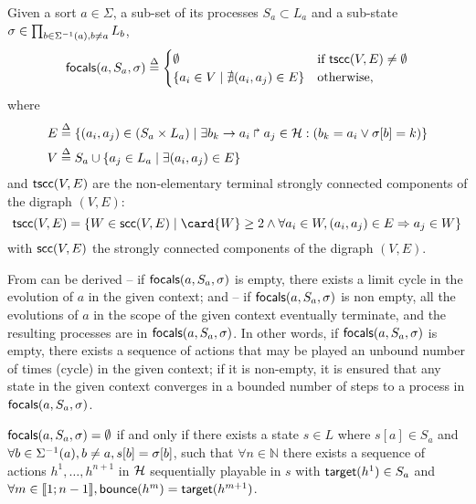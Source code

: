 \begin{definition}\label{def:focals}
Given a sort $a\in\Sigma$, a sub-set of its processes $S_a\subset L_a$ 
and a sub-state
$\sigma \in {\prod_{b\in\Sigma^{-1}(a), b\neq a} L_{b}}$,
\[
\mathsf{focals}(a,S_a,\sigma) \stackrel{\Delta}=
\begin{cases}
\emptyset & \text{if }\mathsf{tscc}(V,E)\neq\emptyset\\
\{ a_i \in V \mid \nexists (a_i,a_j)\in E\} & \text{otherwise,}
\end{cases}
\]
where
\begin{align}
E  & \stackrel{\Delta}= \{(a_i,a_j)\in (S_a \times L_a) \mid 
			\exists b_k\rightarrow a_i\Rsh a_j\in \mathcal{H}:
				(b_k = a_i \vee \sigma[b]=k) \}
\\
V & \stackrel{\Delta}= S_a \cup \{ a_j\in L_a\mid \exists (a_i,a_j)\in E\}
\end{align}
and $\mathsf{tscc}(V,E)$ are the non-elementary terminal strongly connected components of the digraph
$(V,E)$:
\[
\f{tscc}(V,E) = \{
W\in\f{scc}(V,E) \mid \card{W}\geq 2\wedge \forall a_i\in W, (a_i,a_j)\in E\Rightarrow a_j\in W\}
\]
with $\mathsf{scc}(V,E)$ the strongly connected components of the digraph $(V,E)$.
\end{definition}

From  can be derived 
 -- if $\mathsf{focals}(a,S_a,\sigma)$ is empty, there exists a limit cycle in the evolution of
$a$ in the given context;
and  -- if $\mathsf{focals}(a,S_a,\sigma)$ is non empty, all the evolutions of $a$ in the scope
of the given context eventually terminate, and the resulting processes are in $\mathsf{focals}(a,S_a,\sigma)$.
In other words, if $\mathsf{focals}(a,S_a,\sigma)$ is empty, there exists a
sequence of actions that may be played an unbound number of times (cycle) in the given context;
if it is non-empty, it is ensured that any state in the given context converges 
in a bounded number of steps to a process in $\mathsf{focals}(a,S_a,\sigma)$.

\begin{proposition}
\label{pps:no-focals}
$\mathsf{focals}(a,S_a,\sigma)=\emptyset$ if and only if
there exists a 
state $s\in L$
where
$s[a]\in S_a$ and
$\forall b\in \Sigma^{-1}(a), b\neq a, s[b] = \sigma[b]$,
such that
$\forall n\in \mathbb N$
there 
exists a sequence of actions $h^1,\dots,h^{n+1}$ in $\mathcal{H}$
sequentially playable in $s$ with
$\mathsf{target}(h^1)\in S_a$ and
$\forall m\in\llbracket 1 ; n-1 \rrbracket, \mathsf{bounce}(h^m)=\mathsf{target}(h^{m+1})$.
\end{proposition}

